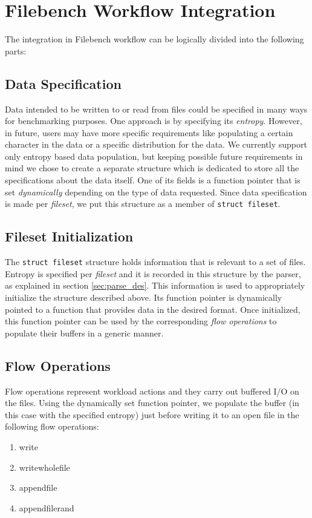 \section{Filebench Workflow Integration}
The integration in Filebench workflow can be logically divided into the following parts:

\subsection{Data Specification}

Data intended to be written to or read from files could be specified in many ways for benchmarking purposes. One approach is by specifying its \textit{entropy}.
 However, in future, users may have more specific requirements like populating a certain character in the data or a specific distribution for the data.
 We currently support only entropy based data population, but keeping possible future requirements in mind we chose to create a separate structure which is dedicated to store all the specifications about the data itself.
One of its fields is a function pointer that is set \textit{dynamically} depending on the type of data requested. Since data specification is made per \textit{fileset}, we put this structure as a member of \verb+struct fileset+.

\subsection{Fileset Initialization}
The \texttt{struct fileset} structure holds information that is relevant to a set of files. Entropy is specified per \textit{fileset} and it is recorded in this structure by the parser, as explained in section \ref{sec:parse_des}. This information is used to appropriately initialize the structure described above. Its function pointer is dynamically pointed to a function that provides data in the desired format. Once initialized, this function pointer can be used by the corresponding \textit{flow operations} to populate their buffers in a generic manner.

\subsection{Flow Operations}
Flow operations represent workload actions and they carry out buffered I/O on the files. Using the dynamically set function pointer, we populate the buffer (in this case with the specified entropy) just before writing it to an open file in the following flow operations:
\begin{enumerate}
\item write
\item writewholefile
\item appendfile
\item appendfilerand
\end{enumerate}
